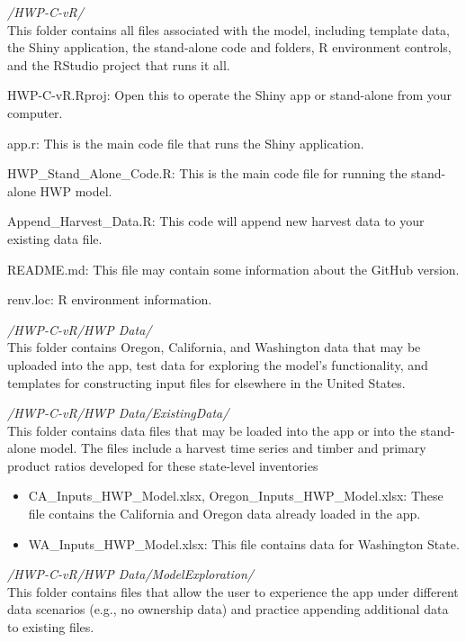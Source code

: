\documentclass[
  openany]{book}
\begin{document}
\emph{/HWP-C-vR/}\\
This folder contains all files associated with the model, including
template data, the Shiny application, the stand-alone code and folders,
R environment controls, and the RStudio project that runs it all.

HWP-C-vR.Rproj: Open this to operate the Shiny app or stand-alone from
your computer.

app.r: This is the main code file that runs the Shiny application.

HWP\_Stand\_Alone\_Code.R: This is the main code file for running the
stand-alone HWP model.

Append\_Harvest\_Data.R: This code will append new harvest data to your
existing data file.

README.md: This file may contain some information about the GitHub
version.

renv.loc: R environment information.

\emph{/HWP-C-vR/HWP Data/}\\
This folder contains Oregon, California, and Washington data that may be
uploaded into the app, test data for exploring the model's
functionality, and templates for constructing input files for elsewhere
in the United States.

\emph{/HWP-C-vR/HWP Data/ExistingData/}\\
This folder contains data files that may be loaded into the app or into
the stand-alone model. The files include a harvest time series and
timber and primary product ratios developed for these state-level
inventories

\begin{itemize}
\item
  CA\_Inputs\_HWP\_Model.xlsx, Oregon\_Inputs\_HWP\_Model.xlsx: These
  file contains the California and Oregon data already loaded in the
  app.
\item
  WA\_Inputs\_HWP\_Model.xlsx: This file contains data for Washington
  State.
\end{itemize}

\emph{/HWP-C-vR/HWP Data/ModelExploration/}\\
This folder contains files that allow the user to experience the app
under different data scenarios (e.g., no ownership data) and practice
appending additional data to existing files.
\end{document}

